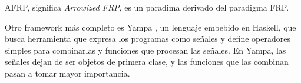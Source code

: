 
AFRP, significa \textit{Arrowized FRP}, es un paradima derivado del paradigma FRP.

  Otro framework más completo es Yampa \cite{yampa}, un lenguaje embebido en Haskell,
que busca 
  herramienta que expresa los programas como señales y
define operadores simples para combinarlas y funciones que procesan las señales.
  En Yampa, las señales dejan de ser objetos de primera clase, y las funciones que
las combinan pasan a tomar mayor importancia.


